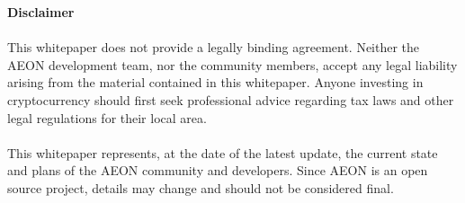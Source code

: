 \textbf{Disclaimer}\\
\\
This whitepaper does not provide a legally binding agreement.  Neither the AEON development team, nor the community members, accept any legal liability arising from the material contained in this whitepaper.   Anyone investing in cryptocurrency should first seek professional advice regarding tax laws and other legal regulations for their local area.\\
\\
This whitepaper represents, at the date of the latest update, the current state and plans of the AEON community and developers.  Since AEON is an open source project, details may change and should not be considered final.

\newpage
